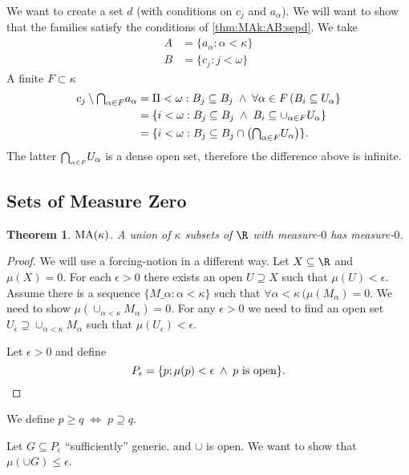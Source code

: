 \documentclass[11pt,pdftex,twoside,a4paper]{article}
\newcommand{\MA}{\ensuremath{\mathop{\rm MA}\nolimits}}
\newtheorem{thm}{Theorem}[section]
\theoremstyle{definition}
\begin{document}
We want to create a set $d$
(with conditions on \(c_j\) and \(a_\alpha\)).
We will want to show that the families satisfy 
the conditions of \ref{thm:MAk:AB:sepd}.
We take
\begin{align*}
A &= \{ a_\alpha: \alpha < \kappa\} \\
B &= \{c_j: j<\omega\}
\end{align*}
A finite \(F\subset  \kappa\)
\begin{align*}
c_j \setminus \mathsmaller{\bigcap_{\alpha\in F}} a_\alpha 
  &= \Pi<\omega: B_j \subseteq B_j\;\land\; 
    \forall \alpha\in F\,(B_i \subseteq U_\alpha\} \\
  &= \{i < \omega: B_j \subseteq B_j\;\land\;  
    B_i \subseteq \cup_{\alpha\in F} U_\alpha\} \\
  &= \{i < \omega: 
    B_j \subseteq B_j\cap
      \left(\mathsmaller{\bigcap_{\alpha\in F}} U_\alpha\right)\}.
\end{align*}
The latter \(\mathsmaller{\bigcap_{\alpha\in F}} U_\alpha\) is a dense open set,
therefore the difference above is infinite.

\subsection{Sets of Measure Zero}

\begin{thm}
\(\MA(\kappa)\).
A union of \(\kappa\) subsets of \(\R\) with measure-$0$
has measure-$0$.
\end{thm}
\begin{proof}
We will use a forcing-notion in a different way.
Let \(X\subseteq\R\) and \(\mu(X)=0\).
For each \(\epsilon>0\) there exists an open \(U\supseteq X\)
such that \(\mu(U)<\epsilon\).
Assume there is a sequence \(\{M\_\alpha: \alpha<\kappa\}\)
such that \(\forall \alpha<\kappa\,(\mu(M_\alpha)=0\).
We need to show \(\mu(\cup_{\alpha<\kappa}M_\alpha) = 0\).
For any \(\epsilon > 0\) we need to find an open set 
\(U_\epsilon \supseteq \cup_{\alpha<\kappa}M_\alpha\)
such that \(\mu(U_\epsilon)<\epsilon\).

Let \(\epsilon>0\) and define
\begin{equation*}
P_\epsilon = \{p; \mu(p)<\epsilon\;\land\;p\textnormal{ is open}\}.
\end{equation*}
\end{proof}
We define \(p \geq q \; \iff \; p \supseteq q\).

Let \(G \subseteq P_\epsilon\) ``sufficiently'' generic.
and \(\cup \) is open.
We want to show that \(\mu(\cup G) \leq \epsilon\).
\end{document}

